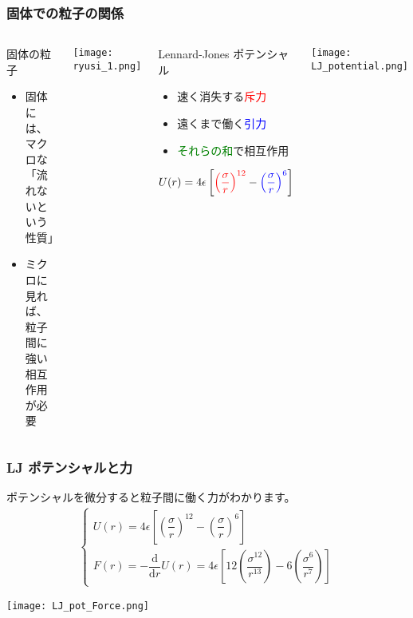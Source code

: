 \documentclass[12pt, dvipdfmx]{beamer}
\newcommand{\rmd}{\mathrm{d}}
\begin{document}
\begin{frame}
	\frametitle{固体での粒子の関係}
	\begin{columns}[T, onlytextwidth]
			\begin{exampleblock}{固体の粒子}
				\begin{itemize}
					\item 固体には、マクロな\\「流れないという性質」
					\item ミクロに見れば、粒子間に強い相互作用が必要
				\end{itemize}
			\end{exampleblock}
			\begin{center}
				\texttt{[image: ryusi\_1.png]}
			\end{center}
			\begin{block}{Lennard-Jones ポテンシャル}
				\begin{itemize}
					\item 速く消失する\textcolor{red}{斥力}
					\item 遠くまで働く\textcolor{blue}{引力}
					\item \textcolor{green}{それらの和}で相互作用
				\end{itemize}
				\vspace{-4mm}
				\scriptsize
				\begin{align*}
					U(r) = 4 \epsilon \left[ \textcolor{red}{\left(\dfrac{\sigma}{r} \right)^{12}} - \textcolor{blue}{\left(\dfrac{\sigma}{r} \right)^{6}} \right]
				\end{align*}
			\end{block}
			\vspace{-3mm}
				\begin{center}
					\texttt{[image: LJ\_potential.png]}
				\end{center}
	\end{columns}
\end{frame}

\begin{frame}
	\frametitle{LJ ポテンシャルと力}
	ポテンシャルを微分すると粒子間に働く力がわかります。
	\small
	\begin{align*}
		\begin{cases}
			U(r) = 4 \epsilon \left[ \left(\dfrac{\sigma}{r} \right)^{12} - \left(\dfrac{\sigma}{r} \right)^{6} \right] \\
			F(r) = -\dfrac{\rmd}{\rmd r}U(r) = 4 \epsilon \left[ 12 \left(\dfrac{\sigma^{12}}{r^{13}} \right) - 6 \left(\dfrac{\sigma^6}{r^7} \right) \right]
		\end{cases}
	\end{align*}
		\begin{center}
			\texttt{[image: LJ\_pot\_Force.png]}
		\end{center}
\end{frame}
\end{document}
